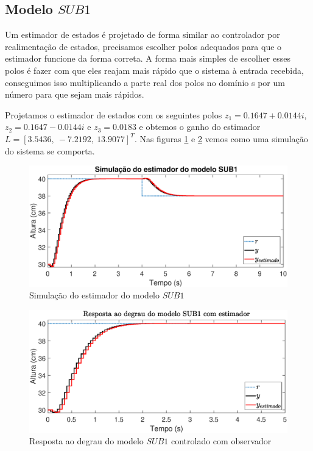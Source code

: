\subsection{Modelo $SUB1$}\label{s:estsub1}
Um estimador de estados é projetado de forma similar ao controlador por realimentação de estados, precisamos escolher polos adequados para que o estimador funcione da forma correta. A forma mais simples de escolher esses polos é fazer com que eles reajam mais rápido que o sistema à entrada recebida, conseguimos isso multiplicando a parte real dos polos no domínio s por um número para que sejam mais rápidos. 


Projetamos o estimador de estados com os seguintes polos $z_1=0.1647 + 0.0144i$, $z_2=0.1647 - 0.0144i$ e $z_3=0.0183$ e obtemos o ganho do estimador $L=[3.5436,~-7.2192,~13.9077]^T$. Nas figuras \ref{fig:estimadorsub1} e \ref{fig:stepestsub1} vemos como uma simulação do sistema se comporta.

\begin{figure}[H]
	\centering
	\includegraphics[width=1\linewidth]{estimadorsub1}
	\caption[Simulação do estimador do modelo $SUB1$]{Simulação do estimador do modelo $SUB1$}
	\label{fig:estimadorsub1}
\end{figure}

\begin{figure}[H]
	\centering
	\includegraphics[width=1\linewidth]{stepestsub1}
	\caption[Resposta ao degrau do modelo $SUB1$ controlado com observador]{Resposta ao degrau do modelo $SUB1$ controlado com observador}
	\label{fig:stepestsub1}
\end{figure}



